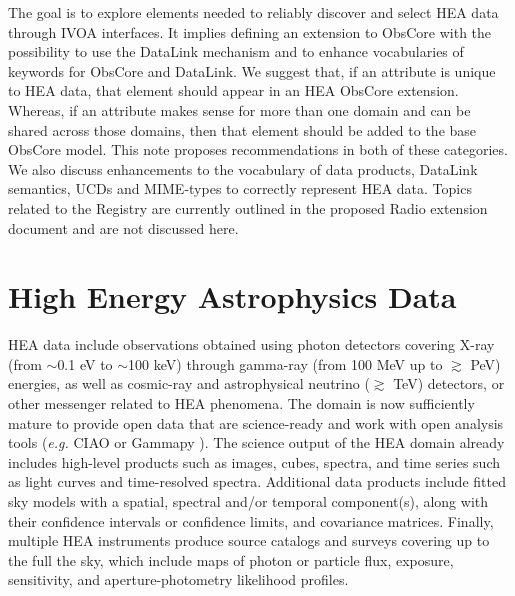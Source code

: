 \documentclass[11pt,a4paper]{ivoa}
\begin{document}
The goal is to explore elements needed to reliably discover and select \gls{HEA} data through \gls{IVOA} interfaces. It implies defining an extension to ObsCore with the possibility to use the DataLink mechanism and to enhance vocabularies of keywords for ObsCore and DataLink. We suggest that, if an attribute is unique to \gls{HEA} data, that element should appear in an \gls{HEA} ObsCore extension. Whereas, if an attribute makes sense for more than one domain and can be shared across those domains, then that element should be added to the base ObsCore model. This note proposes recommendations in both of these categories. We also discuss enhancements to the vocabulary of data products, DataLink semantics, UCDs and MIME-types to correctly represent \gls{HEA} data. Topics related to the Registry are currently outlined in the proposed Radio extension document and are not discussed here.


\section{High Energy Astrophysics Data}

\gls{HEA} data include observations obtained using photon detectors covering X-ray (from $\sim$0.1 eV to $\sim$100 keV) through gamma-ray (from 100 MeV up to $\gtrsim$ PeV) energies, as well as cosmic-ray and astrophysical neutrino ($\gtrsim$ TeV) detectors, or other messenger related to \gls{HEA} phenomena. The domain is now sufficiently mature to provide open data that are science-ready and work with open analysis tools ({\em e.g.\/} CIAO \citep{2006SPIE.6270E..1VF} or Gammapy \citep{gammapy:2023}). The science output of the \gls{HEA} domain already includes high-level products such as images, cubes, spectra, and time series such as light curves and time-resolved spectra. Additional data products include fitted sky models with a spatial, spectral and/or temporal component(s), along with their confidence intervals or confidence limits, and covariance matrices.   Finally, multiple \gls{HEA} instruments produce source catalogs and surveys covering up to the full the sky, which include maps of photon or particle flux, exposure, sensitivity, and aperture-photometry likelihood profiles.
\end{document}
